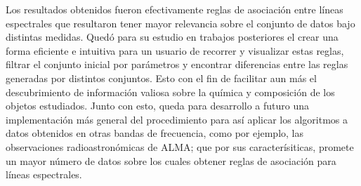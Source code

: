 \begin{intro}
Los resultados obtenidos fueron efectivamente reglas de asociación entre líneas espectrales que resultaron tener mayor relevancia sobre el conjunto de datos bajo distintas medidas. Quedó para su estudio en trabajos posteriores el crear una forma eficiente e intuitiva para un usuario de recorrer y visualizar estas reglas, filtrar el conjunto inicial por parámetros y encontrar diferencias entre las reglas generadas por distintos conjuntos. Esto con el fin de facilitar aun más el descubrimiento de información valiosa sobre la química y composición de los objetos estudiados. Junto con esto, queda para desarrollo a futuro una implementación más general del procedimiento para así aplicar los algoritmos a datos obtenidos en otras bandas de frecuencia, como por ejemplo, las observaciones radioastronómicas de ALMA; que por sus caracterísiticas, promete un mayor número de datos sobre los cuales obtener reglas de asociación para líneas espectrales.

\end{intro}